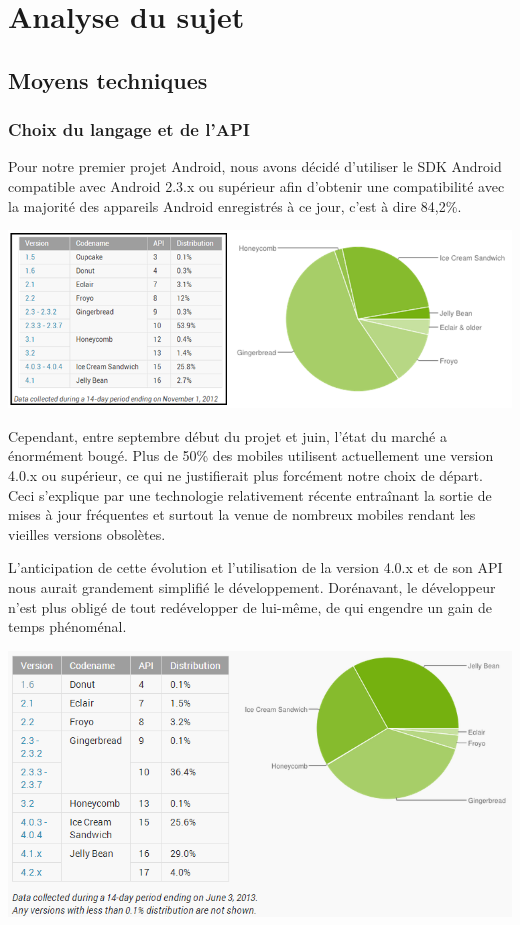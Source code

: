 \documentclass{report}
\begin{document}
\newpage

\section{Analyse du sujet}
\bigskip


\subsection{Moyens techniques}
\bigskip


\subsubsection{Choix du langage et de l'API}

Pour notre premier projet Android, nous avons décidé d’utiliser le SDK
Android compatible avec Android 2.3.x ou supérieur afin d’obtenir une
compatibilité avec la majorité des appareils Android enregistrés à ce
jour, c’est à dire 84,2\%.

\includegraphics[scale=0.75]{images/graph1}

Cependant, entre septembre début du projet et juin, l’état du marché a
énormément bougé.
Plus de 50\% des mobiles utilisent actuellement une version 4.0.x ou
supérieur, ce qui ne justifierait plus forcément notre choix de départ.
Ceci s’explique par une technologie relativement récente entraînant la
sortie de mises à jour fréquentes et surtout la venue de nombreux mobiles
rendant les vieilles versions obsolètes.

L’anticipation de cette évolution et l’utilisation de la version 4.0.x
et de son API nous aurait grandement simplifié le développement.
Dorénavant, le développeur n’est plus obligé de tout redévelopper de
lui-même, de qui engendre un gain de temps phénoménal.
\bigskip


\includegraphics[scale=0.75]{images/graph2}
\end{document}
